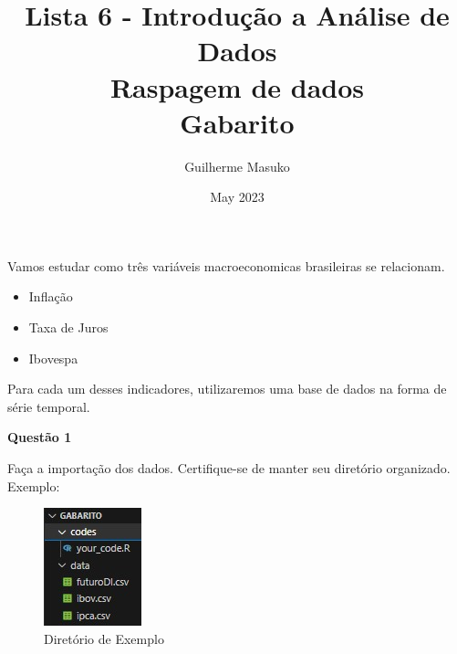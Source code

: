 \documentclass[12pt, a4paper]{article}
\title{Lista 6 - Introdução a Análise de Dados \\
	Raspagem de dados \\
	Gabarito}
\author{Guilherme Masuko}
\date{May 2023}
\begin{document}
	
\clearpage
\maketitle
\thispagestyle{empty}


Vamos estudar como três variáveis macroeconomicas brasileiras se relacionam. 

\begin{itemize}
	\item Inflação
	\item Taxa de Juros
	\item Ibovespa
\end{itemize}

Para cada um desses indicadores, utilizaremos uma base de dados na forma de série temporal. 



\textbf{Questão 1}

Faça a importação dos dados. Certifique-se de manter seu diretório organizado. Exemplo:

\begin{figure}[H]
	\caption{Diretório de Exemplo}
	\centering
	\includegraphics[scale=1]{images/directory.jpg}
\end{figure}




\end{document}

